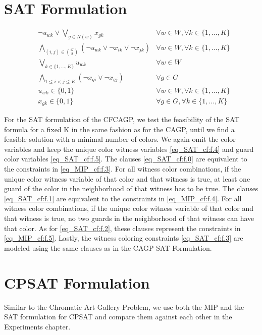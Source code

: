 \section{SAT Formulation}

\begin{align}
\label{eq_SAT_cf:f.0}&\lnot u_{wk} \lor \bigvee_{g \in N(w)}x_{gk} & \forall w \in W, \forall k\in \{1,...,K\}\\
\label{eq_SAT_cf:f.1}&\bigwedge_{(i,j)\in {G\choose 2}} (\lnot u_{wk} \lor \lnot x_{ik} \lor \lnot x_{jk}) & \forall w \in W, \forall k\in \{1,...,K\}\\
\label{eq_SAT_cf:f.2}&\bigvee_{k\in \{1,...,K\}}u_{wk} & \forall w\in W\\
\label{eq_SAT_cf:f.3}&\bigwedge_{1 \leq i < j \leq K} (\lnot x_{gi} \lor \lnot x_{gj}) & \forall g\in G\\
\label{eq_SAT_cf:f.4}& u_{wk} \in \{0,1\} & \forall w\in W, \forall k\in \{1,...,K\}\\
\label{eq_SAT_cf:f.5}& x_{gk} \in \{0,1\} & \forall g\in G, \forall k\in \{1,...,K\}
\end{align}

For the SAT formulation of the CFCAGP, we test the feasibility of the SAT formula for a fixed K in the same fashion as for the CAGP, until we find a feasible solution with a minimal number of colors. We again omit the color variables and keep the unique color witness variables \cref{eq_SAT_cf:f.4} and guard color variables \cref{eq_SAT_cf:f.5}. The clauses \cref{eq_SAT_cf:f.0} are equivalent to the constraints in \cref{eq_MIP_cf:f.3}. For all witness color combinations, if the unique color witness variable of that color and that witness is true, at least one guard of the color in the neighborhood of that witness has to be true. The clauses \cref{eq_SAT_cf:f.1} are equivalent to the constraints in \cref{eq_MIP_cf:f.4}. For all witness color combinations, if the unique color witness variable of that color and that witness is true, no two guards in the neighborhood of that witness can have that color. As for \cref{eq_SAT_cf:f.2}, these clauses represent the constraints in \cref{eq_MIP_cf:f.5}. Lastly, the witness coloring constraints \cref{eq_SAT_cf:f.3} are modeled using the same clauses as in the CAGP SAT Formulation.

\section{CPSAT Formulation}
Similar to the Chromatic Art Gallery Problem, we use both the MIP and the SAT formulation for CPSAT and compare them against each other in the Experiments chapter.

